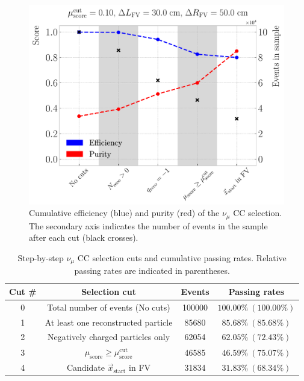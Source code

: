 \begin{figure}[t]
	\centering
	\includegraphics[width=.90\linewidth]{Images/GAr_selection/numu_cc_selection_steps.pdf}
	\caption[Cumulative efficiency and purity for the $\nu_{\mu}$ CC selection.]{Cumulative efficiency (blue) and purity (red) of the $\nu_{\mu}$ CC selection. The secondary axis indicates the number of events in the sample after each cut (black crosses).}
	\label{fig:numuCC_selection_steps}
\end{figure}

\begin{table}[h!]
	\caption[Step-by-step $\nu_{\mu}$ CC selection cuts and cumulative passing rates.]{Step-by-step $\nu_{\mu}$ CC selection cuts and cumulative passing rates. Relative passing rates are indicated in parentheses.}
	\begin{center}
		\begin{small}
			\begin{tabular}{c|ccc}
                Cut \# & Selection cut                       & Events & Passing rates          \\[2mm] \hline
                \rule{0pt}{1.1\normalbaselineskip}0      & Total number of events (No cuts)    & 100000 & $100.00\% ~(100.00\%)$ \\[2mm]
                1      & At least one reconstructed particle                              & 85680  & $85.68 \% ~(85.68 \%)$ \\[2mm]
                2      & Negatively charged particles only                                & 62054  & $62.05\% ~(72.43\%)$   \\[2mm]
                3      & $\mu_{\mathrm{score}} \geq \mu_{\mathrm{score}}^{\mathrm{cut}}$  & 46585  & $46.59\% ~(75.07\%)$   \\[2mm]
                4      & Candidate $\vec{x}_{\mathrm{start}}$ in FV                       & 31834  & $31.83\% ~(68.34\%)$  
                \end{tabular}
		\end{small}
	\end{center}
	\label{tab:numuCC_selection}
\end{table}

